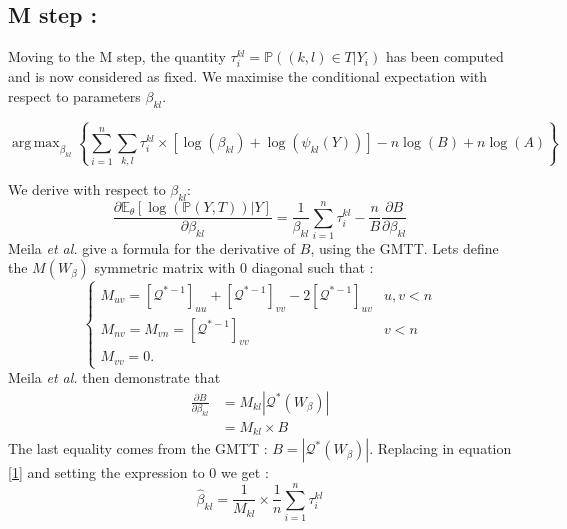 \documentclass[a4paper,10pt]{article}
\DeclareMathOperator*{\argmax}{arg\,max}
\begin{document}
\subsection{M step :\\}
Moving to the M step, the quantity $\tau_i^{kl} = \mathds{P}((k,l)\in T | Y_i)$ has been computed and is now considered as fixed.
We maximise the conditional expectation with respect to parameters $\beta_{kl}$.


 \[\argmax_{\beta_{kl}} \left\{\sum_{i =1}^n\sum_{k,l} \tau_i^{kl}\times \left[ \log(\beta_{kl}) + \log(\psi_{kl}(Y)) \right]
 -n\log(B)+n\log(A)\right\}\]



 We derive with respect to $\beta_{kl}$:
\begin{equation}
 \label{1} \frac{\partial\mathds{E}_\theta[\log(\mathds{P}(Y,T))|Y]}{\partial\beta_{kl}} =\frac{1 }{\beta_{kl}} \sum_{i =1}^n\tau_i^{kl} - \frac{n}{B}
\frac{\partial B}{\partial\beta_{kl}}
\end{equation}
 Meila \textit{et al.} give a formula for the derivative of $B$, using the GMTT. Lets define the $M(W_\beta)$ symmetric matrix with 0 diagonal such that :
 \[\begin{cases}
    M_{uv} = [\mathcal{Q}^{*-1}]_{uu} + [\mathcal{Q}^{*-1}]_{vv} -2[\mathcal{Q}^{*-1}]_{uv} & u,v < n\\
    M_{nv} =M_{vn} =[\mathcal{Q}^{*-1}]_{vv} & v<n\\
     M_{vv} =0.
   \end{cases}\]
Meila \textit{et al.} then demonstrate that 
\begin{align*}
 \frac{\partial B}{\partial\beta_{kl}} &= M_{kl} |\mathcal{Q}^*(W_\beta)|\\
 &=M_{kl} \times B
\end{align*}
The last equality comes from the GMTT : $B = |\mathcal{Q}^*(W_\beta)|$. Replacing in equation \ref{1} and setting the expression to 0 we get :
\[\boxed{\hat{\beta}_{kl} = \frac{  1}{M_{kl}}\times \frac{1}{n}\sum_{i=1}^n \tau_i^{kl}}\]



\end{document}
